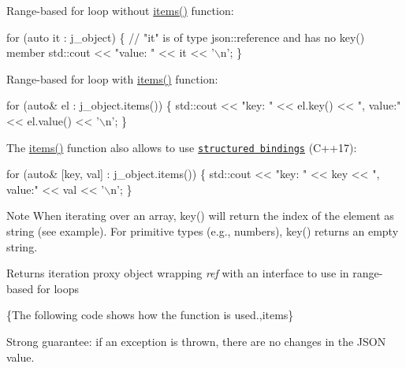 Range-\/based for loop without {\ttfamily \mbox{\hyperlink{classnlohmann_1_1basic__json_afe3e137ace692efa08590d8df40f58dd}{items()}}} function\+:


\begin{DoxyCode}
\textcolor{keywordflow}{for} (\textcolor{keyword}{auto} it : j\_object)
\{
    \textcolor{comment}{// "it" is of type json::reference and has no key() member}
    std::cout << \textcolor{stringliteral}{"value: "} << it << \textcolor{charliteral}{'\(\backslash\)n'};
\}
\end{DoxyCode}


Range-\/based for loop with {\ttfamily \mbox{\hyperlink{classnlohmann_1_1basic__json_afe3e137ace692efa08590d8df40f58dd}{items()}}} function\+:


\begin{DoxyCode}
\textcolor{keywordflow}{for} (\textcolor{keyword}{auto}& el : j\_object.items())
\{
    std::cout << \textcolor{stringliteral}{"key: "} << el.key() << \textcolor{stringliteral}{", value:"} << el.value() << \textcolor{charliteral}{'\(\backslash\)n'};
\}
\end{DoxyCode}


The {\ttfamily \mbox{\hyperlink{classnlohmann_1_1basic__json_afe3e137ace692efa08590d8df40f58dd}{items()}}} function also allows to use \href{https://en.cppreference.com/w/cpp/language/structured_binding}{\tt structured bindings} (C++17)\+:


\begin{DoxyCode}
\textcolor{keywordflow}{for} (\textcolor{keyword}{auto}& [key, val] : j\_object.items())
\{
    std::cout << \textcolor{stringliteral}{"key: "} << key << \textcolor{stringliteral}{", value:"} << val << \textcolor{charliteral}{'\(\backslash\)n'};
\}
\end{DoxyCode}


\begin{DoxyNote}{Note}
When iterating over an array, {\ttfamily key()} will return the index of the element as string (see example). For primitive types (e.\+g., numbers), {\ttfamily key()} returns an empty string.
\end{DoxyNote}
\begin{DoxyReturn}{Returns}
iteration proxy object wrapping {\itshape ref} with an interface to use in range-\/based for loops
\end{DoxyReturn}
\{The following code shows how the function is used.,items\}

Strong guarantee\+: if an exception is thrown, there are no changes in the J\+S\+ON value.

